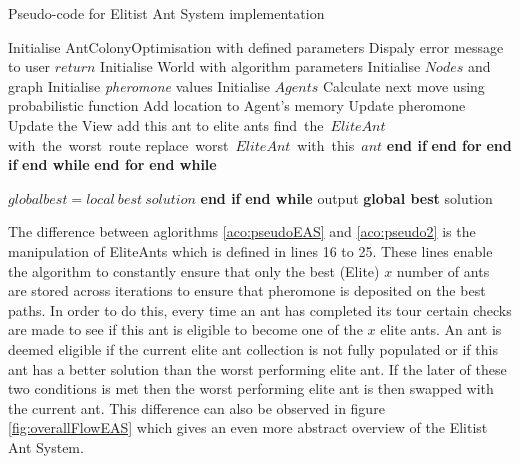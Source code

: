\begin{algorithm}[H]
\caption[Eltist Ant System Pseudo-code]{Pseudo-code for Elitist Ant System implementation}
\label{aco:pseudoEAS}
\begin{algorithmic}[1]
\State Initialise AntColonyOptimisation with defined parameters
\State Dispaly error message to user
\State $return$
\EndIf
\State Initialise World with algorithm parameters
\State Initialise $Nodes$ and graph
\State Initialise \textit{pheromone} values
\State Initialise $Agents$
\State Calculate next move using probabilistic function 
\State Add location to Agent's memory
\State Update pheromone
\State Update the View
\EndWhile 
{}
\State add this ant to elite ants
\Else 
{}
\State find\ the\ $Elite Ant$ with\ the\ worst\ route
\State replace\ worst\ $Elite Ant$\ with\ this\ $ant$ 
\EndIf
\State \textbf{end if} 
\EndFor 
\State \textbf{end for}
\EndIf 
\State \textbf{end if}
\State \textbf{end while}
\EndFor 
\State \textbf{end for}
\EndWhile 
\State \textbf{end while}

\State $global best = local\ best\ solution$
\EndIf
\State \textbf{end if}
\State \textbf{end while}
\State output \textbf{global best} solution
\end{algorithmic}
\end{algorithm}
The difference between aglorithms \ref{aco:pseudoEAS} and \ref{aco:pseudo2} is the manipulation of EliteAnts which is defined in lines 16 to 25. These lines enable the algorithm to constantly ensure that only the best (Elite) $x$ number of ants are stored across iterations to ensure that pheromone is deposited on the best paths. In order to do this, every time an ant has completed its tour certain checks are made to see if this ant is eligible to become one of the $x$ elite ants. An ant is deemed eligible if the current elite ant collection is not fully populated or if this ant has a better solution than the worst performing elite ant. If the later of these two conditions is met then the worst performing elite ant is then swapped with the current ant. This difference can also be observed in figure \ref{fig:overallFlowEAS} which gives an even more abstract overview of the Elitist Ant System.


